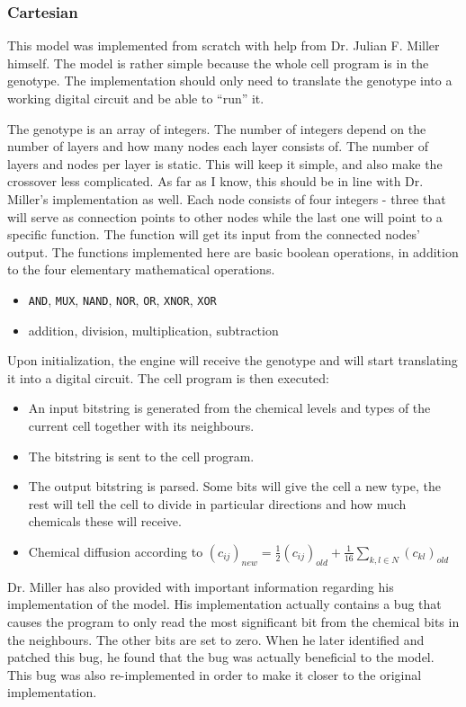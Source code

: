 \subsubsection{Cartesian}
This model was implemented from scratch with help from Dr. Julian F. Miller himself. The model is rather simple because the whole cell program is in the genotype. The implementation should only need to translate the genotype into a working digital circuit and be able to ``run'' it.

The genotype is an array of integers. The number of integers depend on the number of layers and how many nodes each layer consists of. The number of layers and nodes per layer is static. This will keep it simple, and also make the crossover less complicated. As far as I know, this should be in line with Dr. Miller's implementation as well. Each node consists of four integers - three that will serve as connection points to other nodes while the last one will point to a specific function. The function will get its input from the connected nodes' output. The functions implemented here are basic boolean operations, in addition to the four elementary mathematical operations.

\begin{itemize}
	\itemsep=0pt
	\item \texttt{AND}, \texttt{MUX}, \texttt{NAND}, \texttt{NOR}, \texttt{OR}, \texttt{XNOR}, \texttt{XOR}
	\item addition, division, multiplication, subtraction
\end{itemize}

Upon initialization, the engine will receive the genotype and will start translating it into a digital circuit. The cell program is then executed:

\begin{itemize}
	\item An input bitstring is generated from the chemical levels and types of the current cell together with its neighbours.
	\item The bitstring is sent to the cell program.
	\item The output bitstring is parsed. Some bits will give the cell a new type, the rest will tell the cell to divide in particular directions and how much chemicals these will receive.
	\item Chemical diffusion according to $(c_{ij})_{new} = \frac{1}{2}(c_{ij})_{old} + \frac{1}{16}\sum_{k, l \in N} (c_{kl})_{old}$
\end{itemize}

Dr. Miller has also provided with important information regarding his implementation of the model. His implementation actually contains a bug that causes the program to only read the most significant bit from the chemical bits in the neighbours. The other bits are set to zero. When he later identified and patched this bug, he found that the bug was actually beneficial to the model. This bug was also re-implemented in order to make it closer to the original implementation.
